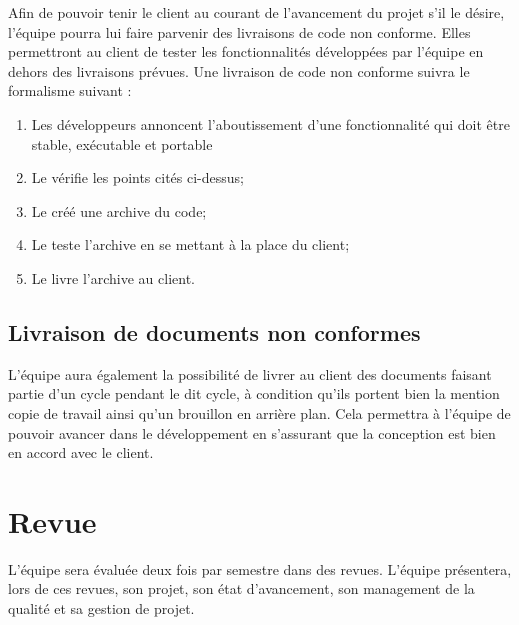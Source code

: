 Afin de pouvoir tenir le client au courant de l’avancement du projet s’il le désire, l’équipe \nomEquipe{} pourra lui faire parvenir des livraisons de code non conforme. Elles permettront au client de tester les fonctionnalités développées par l’équipe en dehors des livraisons prévues. Une livraison de code non conforme suivra le formalisme suivant :
\begin{enumerate}
\item Les développeurs annoncent l’aboutissement d’une fonctionnalité qui doit être stable, exécutable et portable 
\item Le \RD{} vérifie les points cités ci-dessus;
\item Le \RD{} créé une archive du code;
\item Le \CP{} teste l’archive en se mettant à la place du client;
\item Le \CP{} livre l’archive au client.

\end{enumerate}

\subsection{Livraison de documents non conformes}

L’équipe \nomEquipe{} aura également la possibilité de livrer au client des documents faisant partie d’un cycle  pendant le dit cycle, à condition qu’ils portent bien la mention copie de travail ainsi qu’un \og brouillon \fg{} en arrière plan. Cela permettra à l’équipe de pouvoir avancer dans le développement en s’assurant que la conception est bien en accord avec le client.

\section{Revue}
\label{revue}

L’équipe \PICCourt sera évaluée deux fois par semestre dans des revues. L’équipe présentera, lors de ces revues, son projet, son état d’avancement, son management de la qualité et sa gestion de projet.



